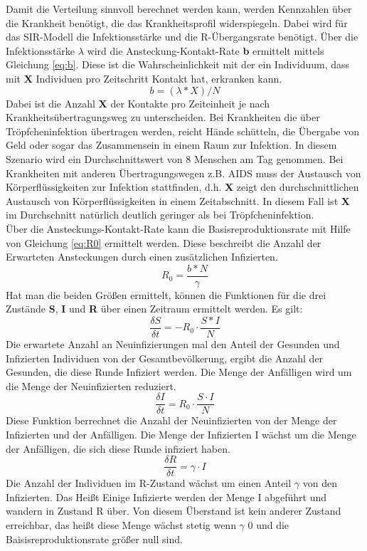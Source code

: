 Damit die Verteilung sinnvoll berechnet werden kann, werden Kennzahlen über die Krankheit benötigt, die das Krankheitsprofil widerspiegeln. Dabei wird für das SIR-Modell die Infektionsstärke und die \glqq R\grqq{}-Übergangsrate benötigt.
Über die Infektionsstärke $\lambda$ wird die Ansteckung-Kontakt-Rate \textbf{b} ermittelt mittels Gleichung \ref{eq:b}. Diese ist die Wahrscheinlichkeit mit der ein Individuum, dass mit \textbf{X} Individuen pro Zeitschritt Kontakt hat, erkranken kann.
\begin{equation} \label{eq:b}
b = ( \lambda * X ) / N
\end{equation}
Dabei ist die Anzahl \textbf{X} der Kontakte pro Zeiteinheit je nach Krankheitsübertragungsweg zu unterscheiden. Bei Krankheiten die über Tröpfcheninfektion übertragen werden, reicht Hände schütteln, die Übergabe von Geld oder sogar das Zusammensein in einem Raum zur Infektion. In diesem Szenario wird ein Durchschnittswert von 8 Menschen am Tag genommen.
Bei Krankheiten mit anderen Übertragungswegen z.B. AIDS muss der Austausch von Körperflüssigkeiten zur Infektion stattfinden, d.h. \textbf{X} zeigt den durchschnittlichen Austausch von Körperflüssigkeiten in einem Zeitabschnitt. In diesem Fall ist \textbf{X} im Durchschnitt natürlich deutlich geringer als bei Tröpfcheninfektion.\\
Über die Ansteckungs-Kontakt-Rate kann die Basisreproduktionsrate   mit Hilfe von Gleichung \ref{eq:R0} ermittelt werden. Diese beschreibt die Anzahl der Erwarteten Ansteckungen durch einen zusätzlichen Infizierten.
\begin{equation}\label{eq:R0}
R_0 = \frac{ b * N }{ \gamma }
\end{equation}
Hat man die beiden Größen ermittelt, können die Funktionen für die drei Zustände \textbf{S}, \textbf{I} und \textbf{R} über einen Zeitraum ermittelt werden. 
Es gilt:
\begin{equation}
\frac{ \delta S }{ \delta t } = -R_0 \cdot \frac{S * I}{N}
\end{equation}
Die erwartete Anzahl an Neuinfizierungen mal den Anteil der Gesunden und Infizierten Individuen von der Gesamtbevölkerung, ergibt die Anzahl der Gesunden, die diese Runde Infiziert werden. Die Menge der Anfälligen wird um die Menge der Neuinfizierten reduziert.
\begin{equation}
\frac{\delta I }{\delta t} = R_0 \cdot \frac{S \cdot I}{N}
\end{equation}
Diese Funktion berrechnet die Anzahl der Neuinfizierten von der Menge der Infizierten und der Anfälligen. Die Menge der Infizierten I wächst um die Menge der Anfälligen, die sich diese Runde infiziert haben.
\begin{equation}
\frac{\delta R }{\delta t} = \gamma \cdot I
\end{equation}
Die Anzahl der Individuen im R-Zustand wächst um einen Anteil $\gamma$ von den Infizierten. Das Heißt Einige Infizierte werden der Menge I abgeführt und wandern in Zustand R über. Von diesem Überstand ist kein anderer Zustand erreichbar, das heißt diese Menge wächst stetig wenn $\gamma$ 0 und die Baisisreproduktionsrate größer null sind.

